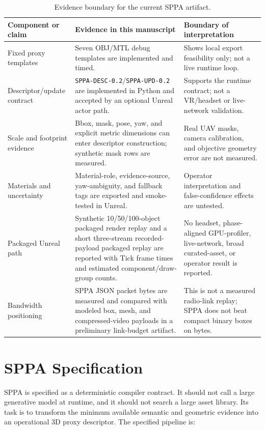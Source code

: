 ﻿\documentclass[11pt,a4paper]{article}
\begin{document}
\begin{table}[tbp]
\centering
\footnotesize
\setlength{\tabcolsep}{4pt}
\caption{Evidence boundary for the current SPPA artifact.}
\label{tab:evidence-status}
\begin{tabular}{@{}p{3.7cm}p{5.0cm}p{5.0cm}@{}}
\toprule
Component or claim & Evidence in this manuscript & Boundary of interpretation \\
\midrule
Fixed proxy templates & Seven OBJ/MTL debug templates are implemented and timed. &
Shows local export feasibility only; not a live runtime loop. \\
Descriptor/update contract & \texttt{SPPA-DESC-0.2}/\texttt{SPPA-UPD-0.2} are
implemented in Python and accepted by an optional Unreal actor path. & Supports
the runtime contract; not a VR/headset or live-network validation. \\
Scale and footprint evidence & Bbox, mask, pose, yaw, and explicit metric
dimensions can enter descriptor construction; synthetic mask rows are measured.
& Real UAV masks, camera calibration, and objective geometry error are not
measured. \\
Materials and uncertainty & Material-role, evidence-source, yaw-ambiguity, and
fallback tags are exported and smoke-tested in Unreal. & Operator
interpretation and false-confidence effects are untested. \\
Packaged Unreal path & Synthetic 10/50/100-object packaged render replay and a
short three-stream recorded-payload packaged replay are reported with Tick frame
times and estimated component/draw-group counts. & No headset, phase-aligned GPU-profiler,
live-network, broad curated-asset, or operator result is reported. \\
Bandwidth positioning & SPPA JSON packet bytes are measured and compared with
modeled box, mesh, and compressed-video payloads in a preliminary link-budget
artifact. & This is not a measured radio-link replay; SPPA does not beat compact
binary boxes on bytes. \\
\bottomrule
\end{tabular}
\end{table}

\section{SPPA Specification}

SPPA is specified as a deterministic compiler contract. It should not call a
large generative model at runtime, and it should not search a large asset
library. Its task is to transform the minimum available semantic and geometric
evidence into an operational 3D proxy descriptor. The specified pipeline is:
\end{document}
